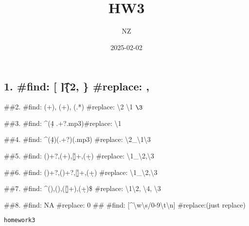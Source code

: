 \documentclass[
]{article}
\title{HW3}
\author{NZ}
\date{2025-02-02}
\begin{document}
\maketitle

\subsection{\texorpdfstring{1. \#find: {[} \t]\{2, \} \#replace:
,}{1. \#find: {[} \{2, \} \#replace: ,}}\label{find-2-replace}

\#\#2. \#find: (\w+), (\w+), (.*) \#replace: \textbackslash2
\textbackslash1 \(\3\)

\#\#3. \#find: \^{}\s*(\d{4} .+?.mp3)\s* \#replace: \textbackslash1\n

\#\#4. \#find: \^{}\s*(\d{4})\s(.+?)(.mp3) \#replace:
\textbackslash2\_\textbackslash1\textbackslash3

\#\#5. \#find: (\w)\w+?,(\w+),{[}\d\.]+,(\d+) \#replace:
\textbackslash1\_\textbackslash2,\textbackslash3

\#\#6. \#find: (\w)\w+?,()\w+?,{[}\d\.]+,(\d+) \#replace:
\textbackslash1\_\textbackslash2,\textbackslash3

\#\#7. \#find: \^{}()\w*,()\w*,({[}\d\.]+),(\d+)\$ \#replace:
\textbackslash1\textbackslash2, \textbackslash4, \textbackslash3

\#\#8. \#find: NA \#replace: 0 \#\# \#find:
{[}\^{}\textbackslash w\textbackslash s/0-9\textbackslash t\textbackslash n{]}
\#replace:(just replace)

\begin{verbatim}
homework3
\end{verbatim}
\end{document}
